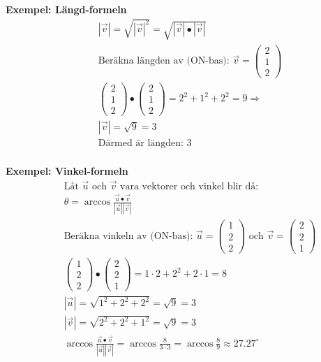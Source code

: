 \textbf{Exempel: Längd-formeln}
\begin{align*}
  &\quad  |\vec{v}| = \sqrt{|\vec{v}|^2} = \sqrt{|\vec{v}|\bullet|\vec{v}|}  \\
  &\quad  \text{Beräkna längden av (ON-bas): } 
  \vec{v} = \begin{pmatrix} 2 \\ 1 \\ 2 \end{pmatrix} \\
  &\quad
  \begin{pmatrix} 2 \\ 1 \\ 2 \end{pmatrix} \bullet \begin{pmatrix} 2 \\ 1 \\ 2 \end{pmatrix} =
  2^2 + 1^2 + 2^2 = 9 \Rightarrow \\
  &\quad  |\vec{v}| = \sqrt{9} = 3 \\
  &\quad  \text{Därmed är längden: } 3 \\
\end{align*}


\textbf{Exempel: Vinkel-formeln}
\begin{align*}
  &\quad  \text{Låt $\vec{u}$ och $\vec{v}$ vara vektorer och vinkel blir då: } \\
  &\quad  \theta = \arccos{\frac{\vec{u}\bullet\vec{v}}{|\vec{u}||\vec{v}|}} \\
  &\quad  \text{Beräkna vinkeln av (ON-bas): } 
  \vec{u} = \begin{pmatrix} 1 \\ 2 \\ 2 \end{pmatrix} 
  \text{ och }
  \vec{v} = \begin{pmatrix} 2 \\ 2 \\ 1 \end{pmatrix} \\
  &\quad
  \begin{pmatrix} 1 \\ 2 \\ 2 \end{pmatrix} \bullet \begin{pmatrix} 2 \\ 2 \\ 1 \end{pmatrix} =
  1\cdot{2} + 2^2 + 2\cdot{1} = 8 \\
  &\quad  |\vec{u}| = \sqrt{1^2+2^2+2^2}=\sqrt{9}=3 \\
  &\quad  |\vec{v}| = \sqrt{2^2+2^2+1^2}=\sqrt{9}=3 \\
  &\quad \arccos{\frac{\vec{u}\bullet\vec{v}}{|\vec{u}||\vec{v}|}} =
  \arccos{\frac{8}{3\cdot{3}}} = \arccos{\frac{8}{9}} \approx 27.27^\circ
\end{align*}


